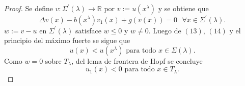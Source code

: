 


\begin{proof}
Se define $v:\Sigma^{\prime}\left(  \lambda\right)  \longrightarrow\mathbb{R}$
por $v:=u\left(  x^{\lambda}\right)  $ y se obtiene que
\begin{equation}
\Delta v\left(  x\right)  -b\left(  x^{\lambda}\right)  v_{1}\left(  x\right)
+g\left(  v\left(  x\right)  \right)  =0\text{ \ \ }\forall x\in\Sigma
^{\prime}\left(  \lambda\right)  \text{.}\tag{14}%
\end{equation}
$w:=v-u$ en $\Sigma^{\prime}\left(  \lambda\right)  $ satisface $w\leq0$ y
$w\neq0$. Luego de $\left(  13\right)  $, $\left(  14\right)  $ y el principio
del m\'{a}ximo fuerte se sigue que
\[
u\left(  x\right)  <u\left(  x^{\lambda}\right)  \text{ \ \ para todo \ }%
x\in\Sigma\left(  \lambda\right)  .
\]
Como $w=0$ sobre $T_{\lambda}$, del lema de frontera de Hopf se concluye
\[
u_{1}\left(  x\right)  <0\text{ \ \ para todo \ }x\in T_{\lambda}\text{.}%
\]

\end{proof}
